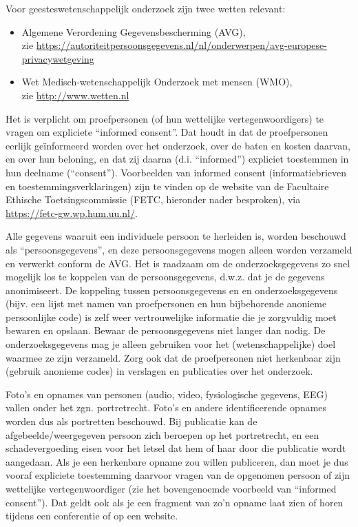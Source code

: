 \documentclass[
]{book}
\begin{document}
Voor geesteswetenschappelijk onderzoek zijn twee wetten relevant:

\begin{itemize}
\item
  Algemene Verordening Gegevensbescherming (AVG),\\
  zie
  \url{https://autoriteitpersoonsgegevens.nl/nl/onderwerpen/avg-europese-privacywetgeving}
\item
  Wet Medisch-wetenschappelijk Onderzoek met mensen (WMO),\\
  zie \url{http://www.wetten.nl}
\end{itemize}

Het is verplicht om proefpersonen (of hun wettelijke vertegenwoordigers)
te vragen om expliciete ``informed consent''. Dat houdt in dat de
proefpersonen eerlijk geïnformeerd worden over het onderzoek, over de
baten en kosten daarvan, en over hun beloning, en dat zij daarna (d.i.
``informed'') expliciet toestemmen in hun deelname (``consent'').
Voorbeelden van informed consent (informatiebrieven en
toestemmingsverklaringen) zijn te vinden op de website van de Facultaire
Ethische Toetsingscommissie (FETC, hieronder nader besproken), via
\url{https://fetc-gw.wp.hum.uu.nl/}.

Alle gegevens waaruit een individuele persoon te herleiden is, worden
beschouwd als ``persoonsgegevens'', en deze persoonsgegevens mogen alleen
worden verzameld en verwerkt conform de AVG. Het is raadzaam om de
onderzoeksgegevens zo snel mogelijk los te koppelen van de
persoonsgegevens, d.w.z. dat je de gegevens anonimiseert. De koppeling
tussen persoonsgegevens en en onderzoeksgegevens (bijv. een lijst met
namen van proefpersonen en hun bijbehorende anonieme persoonlijke code)
is zelf weer vertrouwelijke informatie die je zorgvuldig moet bewaren en
opslaan. Bewaar de persoonsgegevens niet langer dan nodig. De
onderzoeksgegevens mag je alleen gebruiken voor het (wetenschappelijke)
doel waarmee ze zijn verzameld. Zorg ook dat de proefpersonen niet
herkenbaar zijn (gebruik anonieme codes) in verslagen en publicaties
over het onderzoek.

Foto's en opnames van personen (audio, video, fysiologische gegevens,
EEG) vallen onder het zgn. portretrecht. Foto's en andere
identificerende opnames worden dus als portretten beschouwd. Bij
publicatie kan de afgebeelde/weergegeven persoon zich beroepen op het
portretrecht, en een schadevergoeding eisen voor het letsel dat hem of
haar door die publicatie wordt aangedaan. Als je een herkenbare opname
zou willen publiceren, dan moet je dus vooraf expliciete toestemming
daarvoor vragen van de opgenomen persoon of zijn wettelijke
vertegenwoordiger (zie het bovengenoemde voorbeeld van ``informed
consent''). Dat geldt ook als je een fragment van zo'n opname laat zien
of horen tijdens een conferentie of op een website.
\end{document}
